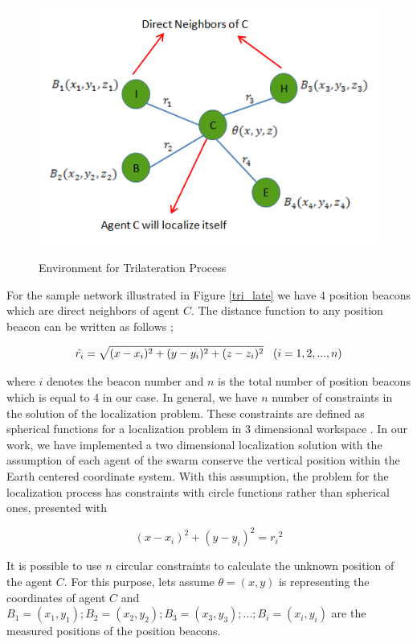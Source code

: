 \begin{figure}[H] 
\caption{Environment for Trilateration Process} \label{tri_late}
\centering
\includegraphics[scale = 0.65]{beacons}
\label{beacons_ref}
\end{figure}

For the sample network illustrated in Figure \ref{tri_late} we have 4 position beacons which are direct neighbors of agent $C$. The distance function to any position beacon can be written as follows \cite{22};

\begin{equation} %
\hat{r_i} = \sqrt{(x-x_i)^2 + (y-y_i)^2+ (z-z_i)^2}    \hspace{0.3cm}   (i=1,2,...,n)
\end{equation}

where $i$ denotes the beacon number and $n$ is the total number of position beacons which is equal to 4 in our case.  In general, we have $n$ number of constraints in the solution of the localization problem. These constraints are defined as spherical functions for a localization problem in 3 dimensional workspace \cite{22}. In our work, we have implemented a two dimensional localization solution with the assumption of each agent of the swarm conserve the vertical position within the Earth centered coordinate system. With this assumption, the problem for the localization process has constraints with circle functions rather than spherical ones, presented with

\begin{equation}
(x-x_i)^2 + (y - y_i)^2 = {r_i}^2
\end{equation}

It is possible to use $n$ circular constraints to calculate the unknown position of the agent $C$. For this purpose, lets assume $\theta = (x,y)$ is representing the coordinates of agent $C$ and $B_1 = (x_1,y_1) ; B_2 = (x_2,y_2) ; B_3 = (x_3,y_3) ; ...  ; B_i = (x_i,y_i)$ are the measured positions of the position beacons.

